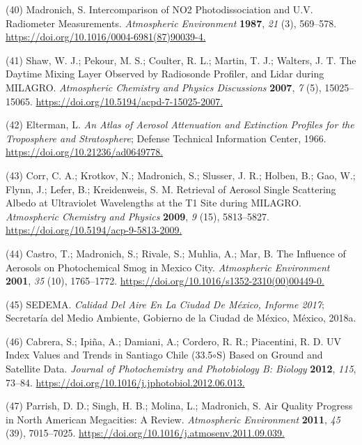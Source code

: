 \documentclass[10pt]{article}
\begin{document}
\label{csl:40}(40) Madronich, S. {Intercomparison of {NO}2 Photodissociation and U.V. Radiometer Measurements}. \textit{Atmospheric Environment} \textbf{1987}, \textit{21} (3), 569–578. \url{https://doi.org/10.1016/0004-6981(87)90039-4.}

\label{csl:41}(41) Shaw, W. J.; Pekour, M. S.; Coulter, R. L.; Martin, T. J.; Walters, J. T. {The Daytime Mixing Layer Observed by Radiosonde Profiler, and Lidar during {MILAGRO}}. \textit{Atmospheric Chemistry and Physics Discussions} \textbf{2007}, \textit{7} (5), 15025–15065. \url{https://doi.org/10.5194/acpd-7-15025-2007.}

\label{csl:42}(42) Elterman, L. \textit{{An Atlas of Aerosol Attenuation and Extinction Profiles for the Troposphere and Stratosphere}}; Defense Technical Information Center, 1966. \url{https://doi.org/10.21236/ad0649778.}

\label{csl:43}(43) Corr, C. A.; Krotkov, N.; Madronich, S.; Slusser, J. R.; Holben, B.; Gao, W.; Flynn, J.; Lefer, B.; Kreidenweis, S. M. {Retrieval of Aerosol Single Scattering Albedo at Ultraviolet Wavelengths at the T1 Site during {MILAGRO}}. \textit{Atmospheric Chemistry and Physics} \textbf{2009}, \textit{9} (15), 5813–5827. \url{https://doi.org/10.5194/acp-9-5813-2009.}

\label{csl:44}(44) Castro, T.; Madronich, S.; Rivale, S.; Muhlia, A.; Mar, B. {The Influence of Aerosols on Photochemical Smog in Mexico City}. \textit{Atmospheric Environment} \textbf{2001}, \textit{35} (10), 1765–1772. \url{https://doi.org/10.1016/s1352-2310(00)00449-0.}

\label{csl:45}(45) SEDEMA. \textit{{Calidad Del Aire En La Ciudad De México, Informe 2017}}; Secretaría del Medio Ambiente, Gobierno de la Ciudad de México, México, 2018a.

\label{csl:46}(46) Cabrera, S.; Ipi{\~{n}}a, A.; Damiani, A.; Cordero, R. R.; Piacentini, R. D. {{UV} Index Values and Trends in Santiago Chile (33.5$\circ$S) Based on Ground and Satellite Data}. \textit{Journal of Photochemistry and Photobiology B: Biology} \textbf{2012}, \textit{115}, 73–84. \url{https://doi.org/10.1016/j.jphotobiol.2012.06.013.}

\label{csl:47}(47) Parrish, D. D.; Singh, H. B.; Molina, L.; Madronich, S. {Air Quality Progress in North American Megacities: A Review}. \textit{Atmospheric Environment} \textbf{2011}, \textit{45} (39), 7015–7025. \url{https://doi.org/10.1016/j.atmosenv.2011.09.039.}
\end{document}
